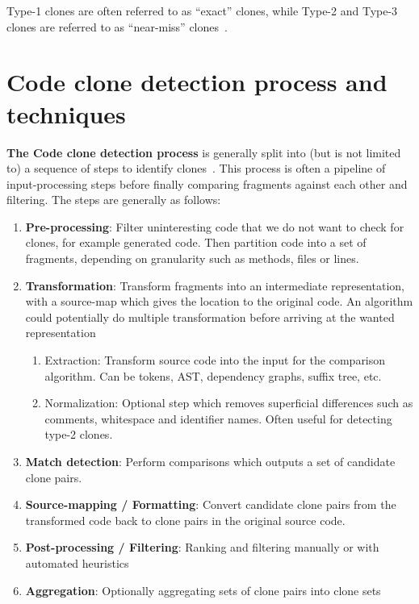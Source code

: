 Type-1 clones are often referred to as ``exact'' clones, while Type-2 and Type-3 clones
are referred to as ``near-miss'' clones~\cite[1]{Zibran_real_time_search}.

\section{Code clone detection process and techniques}

\textbf{The Code clone detection process} is generally split into (but is not limited to)
a sequence of steps to identify clones~\cite{Inoue_introduction_to_cc}. This
process is often a pipeline of input-processing steps before finally comparing fragments
against each other and filtering. The steps are generally as follows:

\begin{enumerate}
	\item \textbf{Pre-processing}: Filter uninteresting code that we do not want to
	      check for clones, for example generated code. Then partition code into a set of
	      fragments, depending on granularity such as methods, files or lines.
	\item \textbf{Transformation}: Transform fragments into an intermediate
	      representation, with a source-map which gives the location to the original code.
          An algorithm could potentially do multiple transformation before arriving at the wanted
          representation
	      \begin{enumerate}
		      \item Extraction: Transform source code into the input for the comparison
		            algorithm. Can be tokens, AST, dependency graphs, suffix tree, etc.
		      \item Normalization: Optional step which removes superficial differences such as
		            comments, whitespace and identifier names. Often useful for detecting type-2
		            clones.
	      \end{enumerate}
	\item \textbf{Match detection}: Perform comparisons which outputs a set of
	      candidate clone pairs.
	\item \textbf{Source-mapping / Formatting}: Convert candidate clone pairs from the transformed
	      code back to clone pairs in the original source code.
	\item \textbf{Post-processing / Filtering}: Ranking and filtering manually or with
	      automated heuristics
	\item \textbf{Aggregation}: Optionally aggregating sets of clone pairs into clone sets
\end{enumerate}

